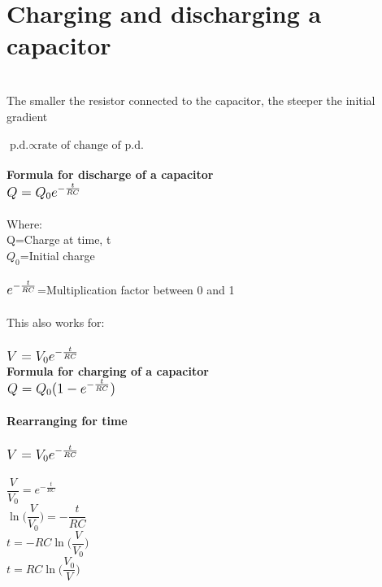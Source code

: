 \documentclass{article}[18pt]
\begin{document}
\section{Charging and discharging a capacitor}
\\
The smaller the resistor connected to the capacitor, the steeper the initial gradient\\
\\
$\text{p.d.}\propto \text{rate of change of p.d.}$\\
\\
\textbf{Formula for discharge of a capacitor}\\
$\mathlarger{\mathlarger{Q=Q_0e^{-\frac{t}{RC}}}}$\\
\\
Where:\\
Q=Charge at time, t\\
$Q_0$=Initial charge\\
\\
$\mathlarger{\mathlarger{e^{-\frac{t}{RC}}}}$=Multiplication factor between 0 and 1\\
\\
This also works for:\\
\\
$\mathlarger{\mathlarger{V=V_0e^{-\frac{t}{RC}}}}$\\
\textbf{Formula for charging of a capacitor}\\
$\mathlarger{\mathlarger{Q=Q_0(1-e^{-\frac{t}{RC}})}}$\\
\\
\textbf{Rearranging for time}\\
\\
$\mathlarger{\mathlarger{V=V_0e^{-\frac{t}{RC}}}}$\\
\\
$\dfrac{V}{V_0}=e^{-\frac{t}{RC}}$\\
$\ln\Big(\dfrac{V}{V_0}\Big)=-\dfrac{t}{RC}$\\
$t=-RC\ln\Big(\dfrac{V}{V_0}\Big)$\\
$t=RC\ln\Big(\dfrac{V_0}{V}\Big)$\\
\\
\end{document}
